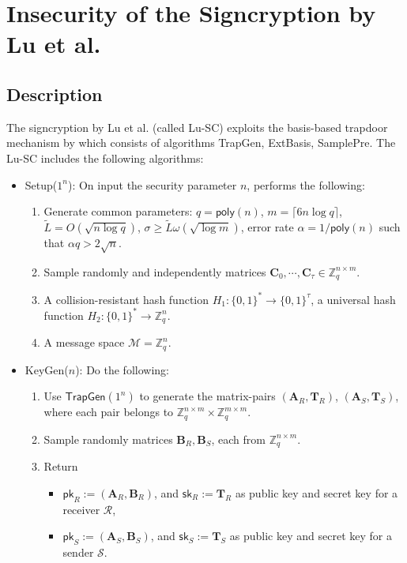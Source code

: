 \documentclass[a4paper,11pt,onecolumn]{elsarticle}
\begin{document}
	
	\section{Insecurity  of the Signcryption by Lu et al. \cite{LWJ+14}} \label{attack}
	
	\subsection{Description}	
	
	The signcryption  by Lu et al. \cite{LWJ+14} (called \textsf{Lu-SC}) exploits the basis-based trapdoor mechanism by \cite{GPV08a} which consists of algorithms \textsf{TrapGen}, \textsf{ExtBasis}, \textsf{SamplePre}.  The \textsf{Lu-SC} includes  the following algorithms:
	
	\begin{itemize}
		\item \textsf{Setup($1^{n}$)}: On input the security parameter $n$, performs the following:
				\begin{enumerate}
					\item Generate common parameters: $q=\textsf{poly}(n)$, $m=\lceil 6n\log q\rceil$, $\tilde{L}=O(\sqrt{n \log q})$, $\sigma\geq \tilde{L} \omega(\sqrt{\log m})$, error rate $\alpha=1/\textsf{poly}(n)$ such that $\alpha q >2\sqrt{n}$.
				\item Sample randomly and independently  matrices $\mathbf{C}_0, \cdots, \mathbf{C}_{\tau} \in \mathbb{Z}_q ^{n \times m}$.
			\item A collision-resistant hash function $H_1:\{0,1\}^{*} \rightarrow \{0,1\} ^{\tau}$, a universal hash function $H_2:\{0,1\}^{*} \rightarrow  \mathbb{Z}_q^n $.
			\item A message space $\mathcal{M}=  \mathbb{Z}_q^n$.
				\end{enumerate}	
		\item \textsf{KeyGen($n$)}: Do the following:
				\begin{enumerate}
					\item Use $\textsf{TrapGen}(1^n)$ to generate the matrix-pairs $(\mathbf{A}_R, \mathbf{T}_R)$,  $(\mathbf{A}_S, \mathbf{T}_S)$, where each pair belongs to $ \mathbb{Z}_q^{n \times m} \times \mathbb{Z}_q^{m \times m}$.
				\item  Sample randomly matrices $\mathbf{B}_R,  \mathbf{B}_S$, each from $\mathbb{Z}_q^{n \times m}$.
				\item Return
				\begin{itemize}
					\item $\mathsf{pk}_R:=(\mathbf{A}_R, \mathbf{B}_R)$, and  $\mathsf{sk}_R:=\textbf{T}_{R}$ as public key and secret key for a receiver $\mathcal{R}$,
					\item $\mathsf{pk}_S:=(\mathbf{A}_S, \mathbf{B}_S)$, and $\mathsf{sk}_S:=\textbf{T}_{S}$ as public key and secret key for a sender $\mathcal{S}$.
				\end{itemize}
				\end{enumerate}
	

\end{itemize}
\end{document}
